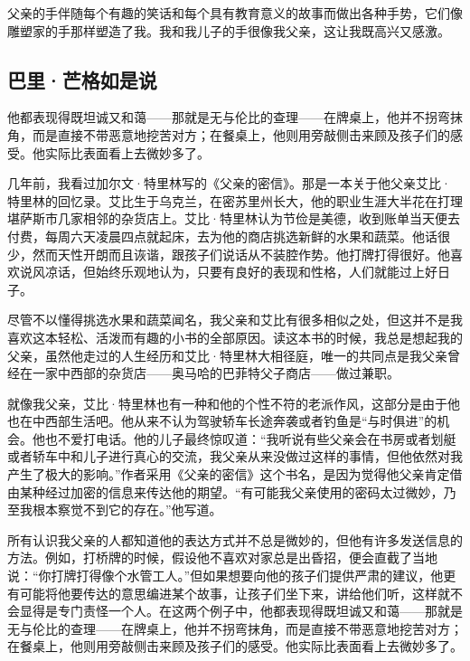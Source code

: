 父亲的手伴随每个有趣的笑话和每个具有教育意义的故事而做出各种手势，它们像雕塑家的手那样塑造了我。我和我儿子的手很像我父亲，这让我既高兴又感激。
\par

\subsection*{巴里·芒格如是说}

\begin{WisdomBox}
\par

他都表现得既坦诚又和蔼——那就是无与伦比的查理——在牌桌上，他并不拐弯抹角，而是直接不带恶意地挖苦对方；在餐桌上，他则用旁敲侧击来顾及孩子们的感受。他实际比表面看上去微妙多了。
\par
\end{WisdomBox}

几年前，我看过加尔文·特里林写的《父亲的密信》。那是一本关于他父亲艾比·特里林的回忆录。艾比生于乌克兰，在密苏里州长大，他的职业生涯大半花在打理堪萨斯市几家相邻的杂货店上。艾比·特里林认为节俭是美德，收到账单当天便去付费，每周六天凌晨四点就起床，去为他的商店挑选新鲜的水果和蔬菜。他话很少，然而天性开朗而且诙谐，跟孩子们说话从不装腔作势。他打牌打得很好。他喜欢说风凉话，但始终乐观地认为，只要有良好的表现和性格，人们就能过上好日子。
\par

尽管不以懂得挑选水果和蔬菜闻名，我父亲和艾比有很多相似之处，但这并不是我喜欢这本轻松、活泼而有趣的小书的全部原因。读这本书的时候，我总是想起我的父亲，虽然他走过的人生经历和艾比·特里林大相径庭，唯一的共同点是我父亲曾经在一家中西部的杂货店——奥马哈的巴菲特父子商店——做过兼职。
\par

就像我父亲，艾比·特里林也有一种和他的个性不符的老派作风，这部分是由于他也在中西部生活吧。他从来不认为驾驶轿车长途奔袭或者钓鱼是“与时俱进”的机会。他也不爱打电话。他的儿子最终惊叹道：“我听说有些父亲会在书房或者划艇或者轿车中和儿子进行真心的交流，我父亲从来没做过这样的事情，但他依然对我产生了极大的影响。”作者采用《父亲的密信》这个书名，是因为觉得他父亲肯定借由某种经过加密的信息来传达他的期望。“有可能我父亲使用的密码太过微妙，乃至我根本察觉不到它的存在。”他写道。
\par

所有认识我父亲的人都知道他的表达方式并不总是微妙的，但他有许多发送信息的方法。例如，打桥牌的时候，假设他不喜欢对家总是出昏招，便会直截了当地说：“你打牌打得像个水管工人。”但如果想要向他的孩子们提供严肃的建议，他更有可能将他要传达的意思编进某个故事，让孩子们坐下来，讲给他们听，这样就不会显得是专门责怪一个人。在这两个例子中，他都表现得既坦诚又和蔼——那就是无与伦比的查理——在牌桌上，他并不拐弯抹角，而是直接不带恶意地挖苦对方；在餐桌上，他则用旁敲侧击来顾及孩子们的感受。他实际比表面看上去微妙多了。
\par

